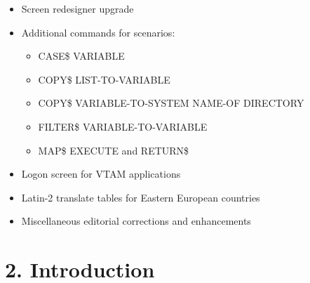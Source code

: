 \documentclass[letterpaper,10pt,english]{sphinxmanual}
\begin{document}
\begin{itemize}
\item {} 
Screen redesigner upgrade

\item {} 
Additional commands for scenarios:
\begin{itemize}
\item {} 
CASE\$ VARIABLE

\item {} 
COPY\$ LIST-TO-VARIABLE

\item {} 
COPY\$ VARIABLE-TO-SYSTEM NAME-OF DIRECTORY

\item {} 
FILTER\$ VARIABLE-TO-VARIABLE

\item {} 
MAP\$ EXECUTE and RETURN\$

\end{itemize}

\end{itemize}

\begin{itemize}
\item {} 
Logon screen for VTAM applications

\item {} 
Latin-2 translate tables for Eastern European countries

\item {} 
Miscellaneous editorial corrections and enhancements

\end{itemize}


\chapter{2. Introduction}
\label{\detokenize{Installation_Guide:introduction}}\label{\detokenize{Installation_Guide:v457ig-introduction}}
\end{document}
